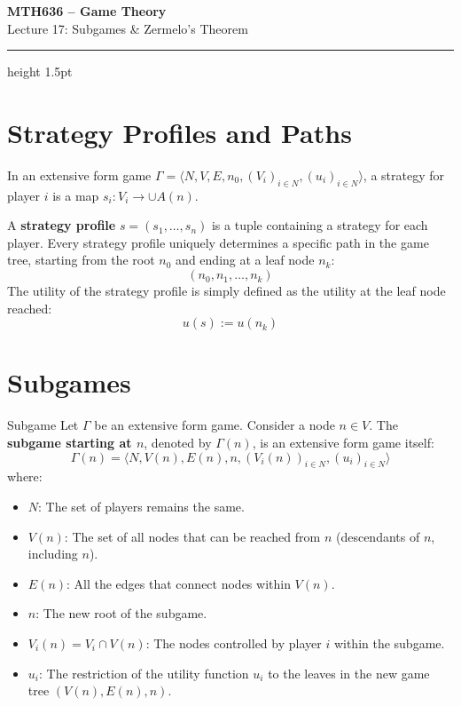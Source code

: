 \documentclass[12pt, a4paper]{article}
\begin{document}
\begin{center}
  {\LARGE\bfseries\sffamily\color{defblue} MTH636 -- Game Theory}\\[6pt]
  {\Large\sffamily Lecture 17: Subgames \& Zermelo's Theorem}\\[4pt]
\end{center}
\vspace{0.5cm}
\hrule height 1.5pt
\vspace{0.3cm}

\section{Strategy Profiles and Paths}

In an extensive form game $\Gamma = \langle N, V, E, n_0, (V_i)_{i \in N}, (u_i)_{i \in N} \rangle$, a strategy for player $i$ is a map $s_i: V_i \to \cup A(n)$.

A \textbf{strategy profile} $s = (s_1, \dots, s_n)$ is a tuple containing a strategy for each player. 
Every strategy profile uniquely determines a specific path in the game tree, starting from the root $n_0$ and ending at a leaf node $n_k$:
\[ (n_0, n_1, \dots, n_k) \]
The utility of the strategy profile is simply defined as the utility at the leaf node reached:
\[ u(s) := u(n_k) \]

\section{Subgames}

\begin{defbox}{Subgame}
  Let $\Gamma$ be an extensive form game. Consider a node $n \in V$. The \textbf{subgame starting at $n$}, denoted by $\Gamma(n)$, is an extensive form game itself:
  \[ \Gamma(n) = \langle N, V(n), E(n), n, (V_i(n))_{i \in N}, (u_i)_{i \in N} \rangle \]
  where:
  \begin{itemize}
      \item $N$: The set of players remains the same.
      \item $V(n)$: The set of all nodes that can be reached from $n$ (descendants of $n$, including $n$).
      \item $E(n)$: All the edges that connect nodes within $V(n)$.
      \item $n$: The new root of the subgame.
      \item $V_i(n) = V_i \cap V(n)$: The nodes controlled by player $i$ within the subgame.
      \item $u_i$: The restriction of the utility function $u_i$ to the leaves in the new game tree $(V(n), E(n), n)$.
  \end{itemize}
\end{defbox}
\end{document}
